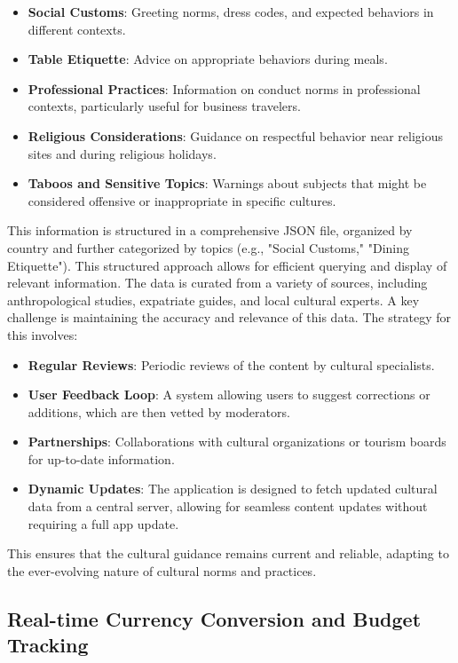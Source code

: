 \documentclass[11pt, a4paper]{article}
\begin{document}
\begin{itemize}
    \item \textbf{Social Customs}: Greeting norms, dress codes, and expected behaviors in different contexts.
    \item \textbf{Table Etiquette}: Advice on appropriate behaviors during meals.
    \item \textbf{Professional Practices}: Information on conduct norms in professional contexts, particularly useful for business travelers.
    \item \textbf{Religious Considerations}: Guidance on respectful behavior near religious sites and during religious holidays.
    \item \textbf{Taboos and Sensitive Topics}: Warnings about subjects that might be considered offensive or inappropriate in specific cultures.
\end{itemize}

This information is structured in a comprehensive JSON file, organized by country and further categorized by topics (e.g., "Social Customs," "Dining Etiquette"). This structured approach allows for efficient querying and display of relevant information. The data is curated from a variety of sources, including anthropological studies, expatriate guides, and local cultural experts. A key challenge is maintaining the accuracy and relevance of this data. The strategy for this involves:
\begin{itemize}
    \item \textbf{Regular Reviews}: Periodic reviews of the content by cultural specialists.
    \item \textbf{User Feedback Loop}: A system allowing users to suggest corrections or additions, which are then vetted by moderators.
    \item \textbf{Partnerships}: Collaborations with cultural organizations or tourism boards for up-to-date information.
    \item \textbf{Dynamic Updates}: The application is designed to fetch updated cultural data from a central server, allowing for seamless content updates without requiring a full app update.
\end{itemize}
This ensures that the cultural guidance remains current and reliable, adapting to the ever-evolving nature of cultural norms and practices.

\subsection{Real-time Currency Conversion and Budget Tracking}
\end{document}

